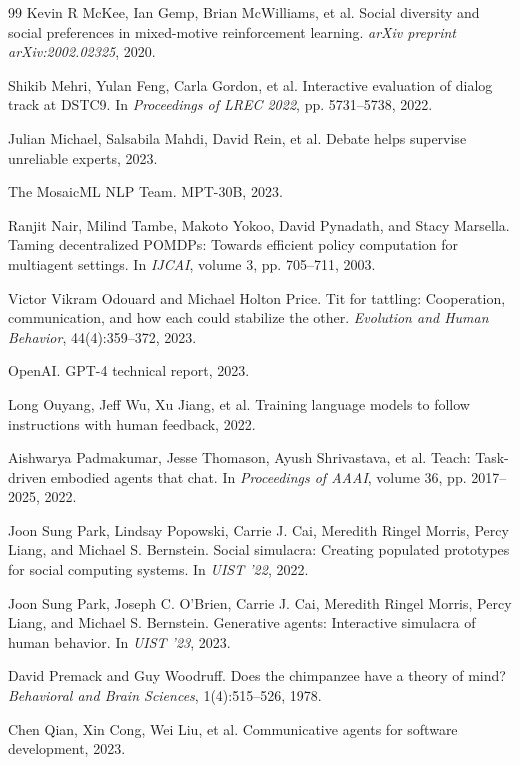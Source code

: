 \documentclass[11pt,a4paper]{article}
\begin{document}
\begin{thebibliography}{99}
Kevin R McKee, Ian Gemp, Brian McWilliams, et al. Social diversity and social preferences in mixed-motive reinforcement learning. \textit{arXiv preprint arXiv:2002.02325}, 2020.

Shikib Mehri, Yulan Feng, Carla Gordon, et al. Interactive evaluation of dialog track at DSTC9. In \textit{Proceedings of LREC 2022}, pp. 5731--5738, 2022.

Julian Michael, Salsabila Mahdi, David Rein, et al. Debate helps supervise unreliable experts, 2023.

The MosaicML NLP Team. MPT-30B, 2023.

Ranjit Nair, Milind Tambe, Makoto Yokoo, David Pynadath, and Stacy Marsella. Taming decentralized POMDPs: Towards efficient policy computation for multiagent settings. In \textit{IJCAI}, volume 3, pp. 705--711, 2003.

Victor Vikram Odouard and Michael Holton Price. Tit for tattling: Cooperation, communication, and how each could stabilize the other. \textit{Evolution and Human Behavior}, 44(4):359--372, 2023.

OpenAI. GPT-4 technical report, 2023.

Long Ouyang, Jeff Wu, Xu Jiang, et al. Training language models to follow instructions with human feedback, 2022.

Aishwarya Padmakumar, Jesse Thomason, Ayush Shrivastava, et al. Teach: Task-driven embodied agents that chat. In \textit{Proceedings of AAAI}, volume 36, pp. 2017--2025, 2022.

Joon Sung Park, Lindsay Popowski, Carrie J. Cai, Meredith Ringel Morris, Percy Liang, and Michael S. Bernstein. Social simulacra: Creating populated prototypes for social computing systems. In \textit{UIST '22}, 2022.

Joon Sung Park, Joseph C. O'Brien, Carrie J. Cai, Meredith Ringel Morris, Percy Liang, and Michael S. Bernstein. Generative agents: Interactive simulacra of human behavior. In \textit{UIST '23}, 2023.

David Premack and Guy Woodruff. Does the chimpanzee have a theory of mind? \textit{Behavioral and Brain Sciences}, 1(4):515--526, 1978.

Chen Qian, Xin Cong, Wei Liu, et al. Communicative agents for software development, 2023.


\end{thebibliography}
\end{document}

